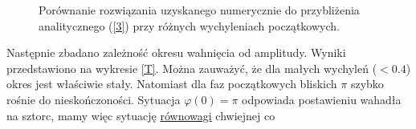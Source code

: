 \documentclass[11pt]{article}
\begin{document}
\begin{figure}[h!]
\centering
{}
\quad
{}
\quad
{}
\quad
{}
\caption{Porównanie rozwiązania uzyskanego numerycznie do 
przybliżenia analitycznego (\ref{3}) przy różnych wychyleniach początkowych.}
\label{M2}
\end{figure}
Następnie zbadano zależność okresu wahnięcia od amplitudy. Wyniki przedstawiono na wykresie \ref{T}. Można zauważyć, że dla
małych wychyleń ($<0.4$) okres jest właściwie stały. Natomiast dla faz początkowych bliskich $\pi$ szybko rośnie do 
nieskończoności. Sytuacja $\varphi(0) = \pi$ odpowiada postawieniu wahadła na sztorc, mamy więc sytuację \underline{równowagi} chwiejnej co
\end{document}
